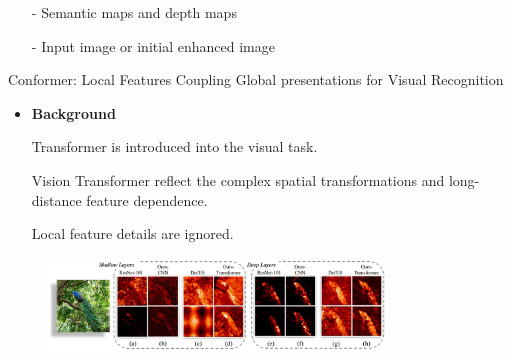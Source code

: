 \documentclass[CJK,aspectratio=169]{beamer}  %
\begin{document}
\begin{frame}
\begin{minipage}{.45\textwidth}
\begin{itemize}
			\item [-] Semantic maps and depth maps
			
			\item [-] Input image or initial enhanced image
			
			\end{itemize}
		\end{minipage}
	\end{frame}
	
	\begin{frame}
		Conformer: Local Features Coupling Global presentations for Visual Recognition\textcolor{blue}{\citep{peng2021conformer}}
		\begin{itemize}
			\item \textbf{Background}
			\item[\checkmark]
			Transformer is introduced into the visual task. 
			
			\item[\checkmark]
			Vision Transformer reflect the complex spatial transformations and long-distance feature dependence.
			
			\item[\checkmark]
			Local feature details are ignored.
		\end{itemize}
		
		\begin{figure}[htbp]
			\begin{center}
				\includegraphics[width=0.8\textwidth]{picture/LLIE/Conformer/Comparison of feature maps of CNN (ResNet-101)}
			\end{center}
		\end{figure}
		
	\end{frame}
	
\end{document}
